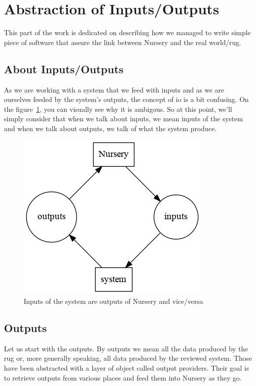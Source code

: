 \documentclass[12pt]{article}
\begin{document}
\clearpage
\section{Abstraction of Inputs/Outputs}

This part of the work is dedicated on describing how we managed to write simple piece of software that assure the link between Nursery and the real world/\gls{rug}.

\subsection{About Inputs/Outputs}

As we are working with a system that we feed with inputs and as we are ourselves feeded by the system's outputs, the concept of \gls{io} is a bit confusing. On the figure~\ref{io_abstract}, you can visually see why it is ambigous. So at this point, we'll simply consider that when we talk about inputs, we mean inputs of the system and when we talk about outputs, we talk of what the system produce.\\

\begin{figure}
    \centering
    \includegraphics[scale=0.6]{io_abstract.png}
    \caption{Inputs of the system are outputs of Nursery and vice/versa}
    \label{io_abstract}
\end{figure}

\subsection{Outputs}

Let us start with the outputs. By outputs we mean all the data produced by the \gls{rug} or, more generally speaking, all data produced by the reviewed system. Those have been abstracted with a layer of object called output providers. Their goal is to retrieve outputs from various places and feed them into Nursery as they go.\\
\end{document}
